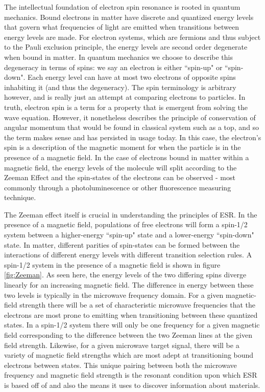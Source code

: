 \documentclass[oneside, noacknowlegments]{BYUPhys}
\begin{document}
The intellectual foundation of electron spin resonance is rooted in quantum mechanics. Bound electrons in matter have discrete and quantized energy levels that govern what frequencies of light are emitted when transitions between energy levels are made. For electron systems, which are fermions and thus subject to the Pauli exclusion principle, the energy levels are second order degenerate when bound in matter. In quantum mechanics we choose to describe this degeneracy in terms of spins: we say an electron is either ``spin-up" or ``spin-down". Each energy level can have at most two electrons of opposite spins inhabiting it (and thus the degeneracy). The spin terminology is arbitrary however, and is really just an attempt at comparing electrons to particles. In truth, electron spin is a term for a property that is emergent from solving the wave equation. However, it nonetheless describes the principle of conservation of angular momentum that would be found in classical system such as a top, and so the term makes sense and has persisted in usage today. In this case, the electron's spin is a description of the magnetic moment for when the particle is in the presence of a magnetic field. In the case of electrons bound in matter within a magnetic field, the energy levels of the molecule will split according to the Zeeman Effect and the spin-states of the electrons can be observed - most commonly through a photoluminescence or other fluorescence measuring technique.

The Zeeman effect itself is crucial in understanding the principles of ESR. In the presence of a magnetic field, populations of free electrons will form a spin-1/2 system between a higher-energy ``spin-up" state and a lower-energy ``spin-down" state. In matter, different parities of spin-states can be formed between the interactions of different energy levels with different transition selection rules. A spin-1/2 system in the presence of a magnetic field is shown in figure \ref{fig:Zeeman}. As seen here, the energy levels of the two differing spins diverge linearly for an increasing magnetic field. The difference in energy between these two levels is typically in the microwave frequency domain. For a given magnetic-field strength there will be a set of characteristic microwave frequencies that the electrons are most prone to emitting when transitioning between these quantized states. In a spin-1/2 system there will only be one frequency for a given magnetic field corresponding to the difference between the two Zeeman lines at the given field strength. Likewise, for a given microwave target signal, there will be a variety of magnetic field strengths which are most adept at transitioning bound electrons between states. This unique pairing between both the microwave frequency and magnetic field strength is the resonant condition upon which ESR is based off of and also the means it uses to discover information about materials.
\end{document}
